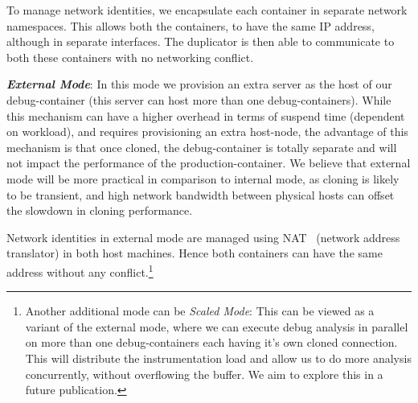 To manage network identities, we encapsulate each container in separate network namespaces.
This allows both the containers, to have the same IP address, although in separate interfaces.
The duplicator is then able to communicate to both these containers with no networking conflict.

\noindent
\textbf{\textit{External Mode}}: In this mode we provision an extra server as the host of our debug-container (this server can host more than one debug-containers). 
While this mechanism can have a higher overhead in terms of suspend time (dependent on workload), and requires provisioning an extra host-node, the advantage of this mechanism is that once cloned, the debug-container is totally separate and will not impact the performance of the production-container.
We believe that external mode will be more practical in comparison to internal mode, as cloning is likely to be transient, and high network bandwidth between physical hosts can offset the slowdown in cloning performance. 

Network identities in external mode are managed using NAT~\cite{nat} (network address translator) in both host machines. 
Hence both containers can have the same address without any conflict.\footnote{Another additional mode can be \textit{Scaled Mode}: This can be viewed as a variant of the external mode, where we can execute debug analysis in parallel on more than one debug-containers each having it's own cloned connection. This will distribute the instrumentation load and allow us to do more analysis concurrently, without overflowing the buffer. We aim to explore this in a future publication.}



